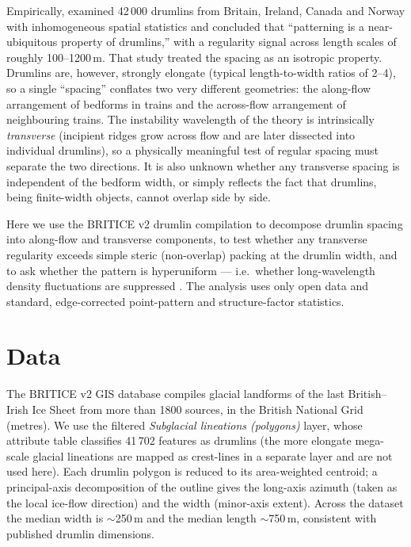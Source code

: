 \documentclass[11pt]{article}
\begin{document}
Empirically, \citet{clark2018spatial} examined 42\,000 drumlins from Britain, Ireland, Canada and Norway
with inhomogeneous spatial statistics and concluded that ``patterning is a near-ubiquitous property of
drumlins,'' with a regularity signal across length scales of roughly 100--1200\,m. That study treated the
spacing as an isotropic property. Drumlins are, however, strongly elongate (typical length-to-width
ratios of 2--4), so a single ``spacing'' conflates two very different geometries: the along-flow
arrangement of bedforms in trains and the across-flow arrangement of neighbouring trains. The instability
wavelength of the theory is intrinsically \emph{transverse} (incipient ridges grow across flow and are
later dissected into individual drumlins), so a physically meaningful test of regular spacing must
separate the two directions. It is also unknown whether any transverse spacing is independent of the
bedform width, or simply reflects the fact that drumlins, being finite-width objects, cannot overlap
side by side.

Here we use the BRITICE v2 drumlin compilation \citep{clark2018britice} to decompose drumlin spacing
into along-flow and transverse components, to test whether any transverse regularity exceeds simple
steric (non-overlap) packing at the drumlin width, and to ask whether the pattern is hyperuniform ---
i.e.\ whether long-wavelength density fluctuations are suppressed \citep{torquato2018}. The analysis uses
only open data and standard, edge-corrected point-pattern and structure-factor statistics.

\section{Data}
The BRITICE v2 GIS database \citep{clark2018britice} compiles glacial landforms of the last
British--Irish Ice Sheet from more than 1800 sources, in the British National Grid (metres). We use the
filtered \textit{Subglacial lineations (polygons)} layer, whose attribute table classifies 41\,702
features as drumlins (the more elongate mega-scale glacial lineations are mapped as crest-lines in a
separate layer and are not used here). Each drumlin polygon is reduced to its area-weighted centroid; a
principal-axis decomposition of the outline gives the long-axis azimuth (taken as the local ice-flow
direction) and the width (minor-axis extent). Across the dataset the median width is $\sim$250\,m and the
median length $\sim$750\,m, consistent with published drumlin dimensions.
\end{document}

